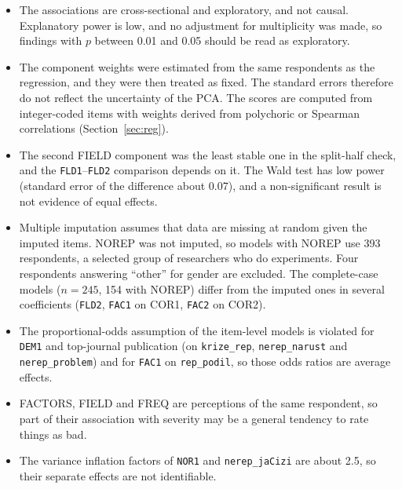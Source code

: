 \documentclass[11pt,a4paper]{article}
\newcommand{\var}[1]{\texttt{#1}}
\begin{document}
\begin{itemize}
\item The associations are cross-sectional and exploratory, and not causal. Explanatory power is low, and no adjustment for multiplicity was made, so findings with $p$ between 0.01 and 0.05 should be read as exploratory.
\item The component weights were estimated from the same respondents as the regression, and they were then treated as fixed. The standard errors therefore do not reflect the uncertainty of the PCA. The scores are computed from integer-coded items with weights derived from polychoric or Spearman correlations (Section~\ref{sec:reg}).
\item The second FIELD component was the least stable one in the split-half check, and the \var{FLD1}--\var{FLD2} comparison depends on it. The Wald test has low power (standard error of the difference about 0.07), and a non-significant result is not evidence of equal effects.
\item Multiple imputation assumes that data are missing at random given the imputed items. NOREP was not imputed, so models with NOREP use 393 respondents, a selected group of researchers who do experiments. Four respondents answering ``other'' for gender are excluded. The complete-case models ($n=245$, 154 with NOREP) differ from the imputed ones in several coefficients (\var{FLD2}, \var{FAC1} on COR1, \var{FAC2} on COR2).
\item The proportional-odds assumption of the item-level models is violated for \var{DEM1} and top-journal publication (on \var{krize\_rep}, \var{nerep\_narust} and \var{nerep\_problem}) and for \var{FAC1} on \var{rep\_podil}, so those odds ratios are average effects.
\item FACTORS, FIELD and FREQ are perceptions of the same respondent, so part of their association with severity may be a general tendency to rate things as bad.
\item The variance inflation factors of \var{NOR1} and \var{nerep\_jaCizi} are about 2.5, so their separate effects are not identifiable.
\end{itemize}
\end{document}
